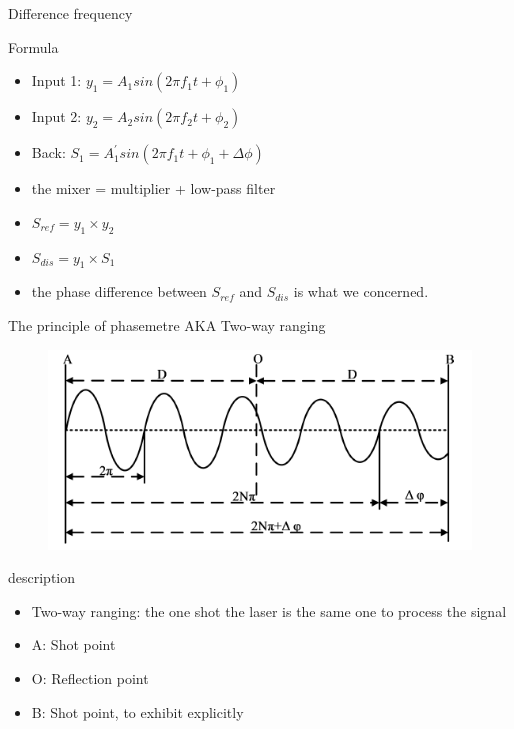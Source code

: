 \documentclass{beamer}
\begin{document}
\begin{frame}[fragile]{Difference frequency}
    \begin{block}{Formula}
        \begin{itemize}
            \item Input 1: $y_1=A_1sin(2\pi f_1 t+\phi_1)$
            \item Input 2: $y_2=A_2sin(2\pi f_2 t+\phi_2)$
            \item Back: $S_1 = A_1^{'}sin(2\pi f_1 t + \phi_1 + \varDelta\phi)$
            \item the mixer = multiplier + low-pass filter
            \item $S_{ref} = y_1 \times y_2$
            \item $S_{dis} = y_1 \times S_1$
            \item the phase difference between $S_{ref}$ and $S_{dis}$ is what we concerned.
        \end{itemize}
    \end{block}
\end{frame}

\begin{frame}[fragile]{The principle of phasemetre AKA Two-way ranging}
    \begin{figure}
        \includegraphics[width=0.5\linewidth]{images/two-way-ranging.png}
    \end{figure}

    \begin{block}{description}
        \begin{itemize}
            \item Two-way ranging: the one shot the laser is the same one to process the signal
            \item A: Shot point
            \item O: Reflection point
            \item B: Shot point, to exhibit explicitly
        \end{itemize}
    \end{block}
\end{frame}
\end{document}

